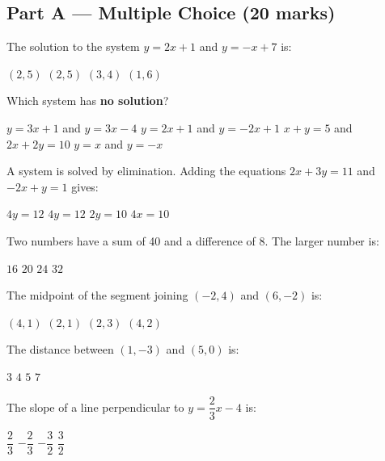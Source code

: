 \documentclass[addpoints]{exam}
\begin{document}
\newpage
\begin{questions}

\section*{Part A --- Multiple Choice (20 marks)}
\vspace{5mm}

\question[1] The solution to the system $y = 2x + 1$ and $y = -x + 7$ is:
\begin{choices}
    \choice $(2, 5)$
    \correctchoice $(2, 5)$
    \choice $(3, 4)$
    \choice $(1, 6)$
\end{choices}

\question[1] Which system has \textbf{no solution}?
\begin{choices}
    \correctchoice $y = 3x + 1$ and $y = 3x - 4$
    \choice $y = 2x + 1$ and $y = -2x + 1$
    \choice $x + y = 5$ and $2x + 2y = 10$
    \choice $y = x$ and $y = -x$
\end{choices}

\question[1] A system is solved by elimination. Adding the equations $2x + 3y = 11$ and
$-2x + y = 1$ gives:
\begin{choices}
    \choice $4y = 12$
    \correctchoice $4y = 12$
    \choice $2y = 10$
    \choice $4x = 10$
\end{choices}

\question[1] Two numbers have a sum of 40 and a difference of 8. The larger number is:
\begin{choices}
    \choice $16$
    \choice $20$
    \correctchoice $24$
    \choice $32$
\end{choices}

\question[1] The midpoint of the segment joining $(-2, 4)$ and $(6, -2)$ is:
\begin{choices}
    \choice $(4, 1)$
    \correctchoice $(2, 1)$
    \choice $(2, 3)$
    \choice $(4, 2)$
\end{choices}

\question[1] The distance between $(1, -3)$ and $(5, 0)$ is:
\begin{choices}
    \choice $3$
    \choice $4$
    \correctchoice $5$
    \choice $7$
\end{choices}

\question[1] The slope of a line perpendicular to $y = \dfrac{2}{3}x - 4$ is:
\begin{choices}
    \choice $\dfrac{2}{3}$
    \choice $-\dfrac{2}{3}$
    \correctchoice $-\dfrac{3}{2}$
    \choice $\dfrac{3}{2}$
\end{choices}


\end{questions}
\end{document}
